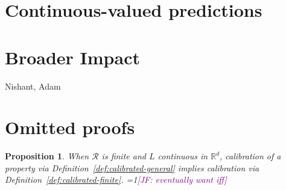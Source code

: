 \documentclass{article}
\newcommand{\Comments}{1}
\newcommand{\mynote}[2]{\ifnum\Comments=1\textcolor{#1}{#2}\fi}
\newcommand{\jessie}[1]{\mynote{purple}{[JF: #1]}}
\newcommand{\reals}{\mathbb{R}}
\newcommand{\R}{\mathcal{R}}
\newtheorem{proposition}{Proposition}
\begin{document}
\section{Continuous-valued predictions}\label{sec:contin-consis}



\newpage

\section*{Broader Impact}

\begin{ack}
Nishant, Adam
\end{ack}




\newpage
\appendix
\section{Omitted proofs}
\begin{proposition}
	When $\R$ is finite and $L$ continuous in $\reals^d$, calibration of a property via Definition~\ref{def:calibrated-general} implies calibration via Definition~\ref{def:calibrated-finite}.
	\jessie{eventually want iff}
\end{proposition}
\end{document}
